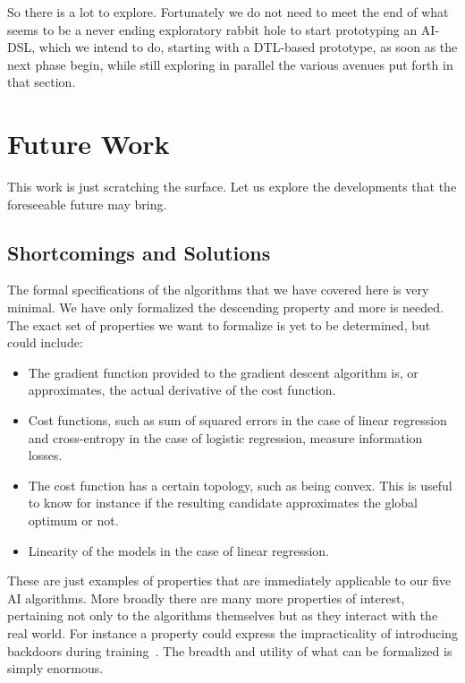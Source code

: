 \documentclass[]{report}
\begin{document}
So there is a lot to explore.  Fortunately we do not need to meet the
end of what seems to be a never ending exploratory rabbit hole to
start prototyping an AI-DSL, which we intend to do, starting with a
DTL-based prototype, as soon as the next phase begin, while still
exploring in parallel the various avenues put forth in that section.

\section{Future Work}
This work is just scratching the surface.  Let us explore the
developments that the foreseeable future may bring.

\subsection{Shortcomings and Solutions}
The formal specifications of the algorithms that we have covered here
is very minimal.  We have only formalized the descending property and
more is needed.  The exact set of properties we want to formalize is
yet to be determined, but could include:
\begin{itemize}
\item The gradient function provided to the gradient descent algorithm
  is, or approximates, the actual derivative of the cost function.
\item Cost functions, such as sum of squared errors in the case of
  linear regression and cross-entropy in the case of logistic
  regression, measure information losses.
\item The cost function has a certain topology, such as being convex.
  This is useful to know for instance if the resulting candidate
  approximates the global optimum or not.
\item Linearity of the models in the case of linear regression.
\end{itemize}
These are just examples of properties that are immediately applicable
to our five AI algorithms.  More broadly there are many more
properties of interest, pertaining not only to the algorithms
themselves but as they interact with the real world.  For instance a
property could express the impracticality of introducing backdoors
during training~\cite{Menisov2022}.  The breadth and utility of what
can be formalized is simply enormous.
\end{document}
